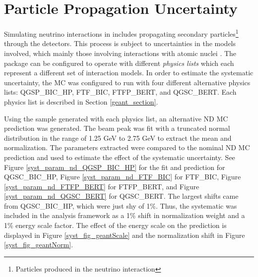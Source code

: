 {\begin{figure}
\end{figure}
\clearpage

\section{Particle Propagation Uncertainty}

Simulating neutrino interactions in \nova includes propagating
secondary particles\footnote{
Particles produced in the neutrino interaction}
through the detectors.
This process is subject to uncertainties in the models involved, which mainly
those involving interactions with atomic nuclei \cite{folger2004binary}.
The \geant package can be configured to operate with different
\textit{physics lists} which each represent a different set of interaction
models.
In order to estimate the systematic uncertainty, the \nova MC was
configured to run with four different alternative physics lists:
QGSP\_BIC\_HP, FTF\_BIC, FTFP\_BERT, and QGSC\_BERT.
Each physics list is described in Section \ref{geant_section}.

Using the sample generated with each physics list, an
alternative ND MC prediction was generated.
The beam peak was fit with a truncated normal distribution in the range
of 1.25 GeV to 2.75 GeV to extract the mean and normalization.
The parameters extracted were compared to the nominal ND MC
prediction and used to estimate the effect of the systematic uncertainty.
See Figure \ref{syst_param_nd_QGSP_BIC_HP} for the fit and prediction for
QGSC\_BIC\_HP,
Figure \ref{syst_param_nd_FTF_BIC} for FTF\_BIC,
Figure \ref{syst_param_nd_FTFP_BERT} for FTFP\_BERT,
and Figure \ref{syst_param_nd_QGSC_BERT} for QGSC\_BERT.
The largest shifts came from QGSC\_BIC\_HP, which were just shy of 1\%.
Thus, the systematic was included in the analysis framework as a 1\%
shift in normalization weight and a 1\% energy scale factor.
The effect of the energy scale on the prediction is displayed
in Figure \ref{syst_fig_geantScale}
and the normalization shift in Figure \ref{syst_fig_geantNorm}.

}
